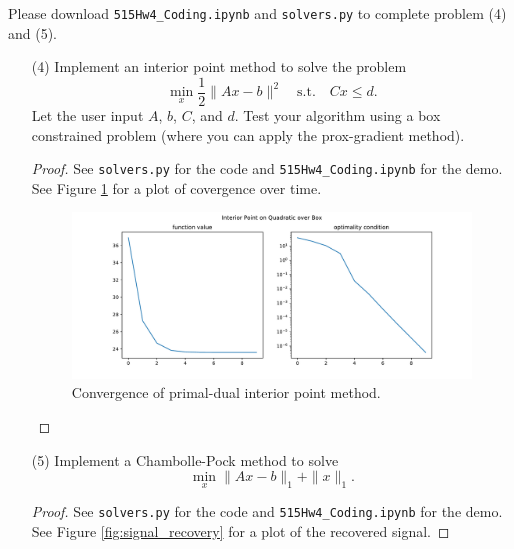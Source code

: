 \documentclass[11pt]{amsart}
\begin{document}
\vskip 8pt \noindent
Please download \texttt{515Hw4\_Coding.ipynb} and \texttt{solvers.py} to complete problem (4) and (5).
\vskip 8pt

\begin{enumerate}

\item[(4)] Implement an interior point method to solve the problem 
\[
\min_x \frac{1}{2}\|Ax-b\|^2 \quad \mbox{s.t.} \quad Cx \leq d. 
\]
Let the user input $A$, $b$, $C$, and $d$. Test your algorithm using a box constrained problem 
(where you can apply the prox-gradient method). 

\begin{proof}
  See \texttt{solvers.py} for the code and \texttt{515Hw4\_Coding.ipynb} for the
  demo. See Figure \ref{fig:interior_point} for a plot of covergence over time.

  \begin{figure}
    \centering
    \includegraphics[width=\textwidth]{interior_point.pdf}
    \caption{Convergence of primal-dual interior point method.}
    \label{fig:interior_point}
  \end{figure}
\end{proof}



\item[(5)] Implement a Chambolle-Pock method to solve  
\[
\min_{x} \|Ax-b\|_1 + \|x\|_1. 
\]

\begin{proof}
  See \texttt{solvers.py} for the code and \texttt{515Hw4\_Coding.ipynb} for the
  demo. See Figure \ref{fig:signal_recovery} for a plot of the recovered signal.


\end{proof}
\end{enumerate}
\end{document}
